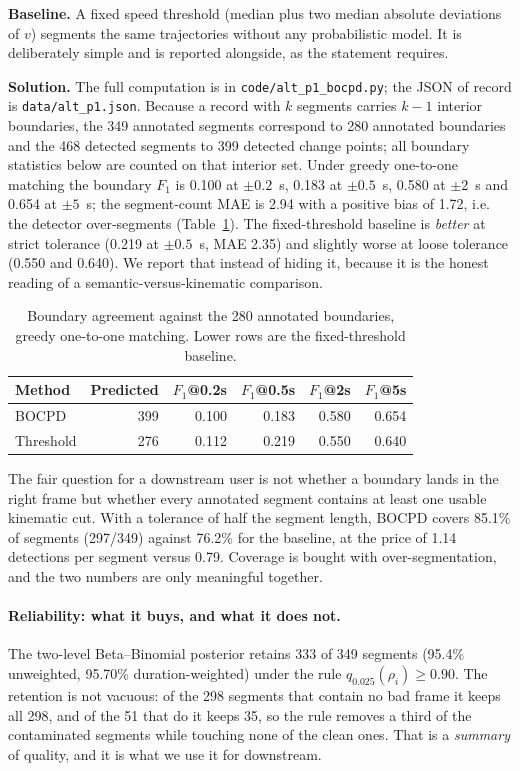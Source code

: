 \documentclass{swmcmthesis}
\begin{document}
\textbf{Baseline.} A fixed speed threshold (median plus two median absolute deviations of $v$) segments the same trajectories without any probabilistic model. It is deliberately simple and is reported alongside, as the statement requires.

\textbf{Solution.} The full computation is in \texttt{code/alt\_p1\_bocpd.py}; the JSON of record is \texttt{data/alt\_p1.json}. Because a record with $k$ segments carries $k-1$ interior boundaries, the 349 annotated segments correspond to 280 annotated boundaries and the 468 detected segments to 399 detected change points; all boundary statistics below are counted on that interior set. Under greedy one-to-one matching the boundary $F_1$ is 0.100 at $\pm0.2$~s, 0.183 at $\pm0.5$~s, 0.580 at $\pm2$~s and 0.654 at $\pm5$~s; the segment-count MAE is 2.94 with a positive bias of 1.72, i.e. the detector over-segments (Table~\ref{tab:p1f1}). The fixed-threshold baseline is \emph{better} at strict tolerance (0.219 at $\pm0.5$~s, MAE 2.35) and slightly worse at loose tolerance (0.550 and 0.640). We report that instead of hiding it, because it is the honest reading of a semantic-versus-kinematic comparison.

\begin{table}[tbp]\centering\footnotesize
\caption{Boundary agreement against the 280 annotated boundaries, greedy one-to-one matching. Lower rows are the fixed-threshold baseline.}\label{tab:p1f1}
\begin{tabular}{lrrrrr}
\toprule
Method & Predicted & $F_1$@0.2s & $F_1$@0.5s & $F_1$@2s & $F_1$@5s \\
\midrule
BOCPD & 399 & 0.100 & 0.183 & 0.580 & 0.654 \\
Threshold & 276 & 0.112 & 0.219 & 0.550 & 0.640 \\
\bottomrule
\end{tabular}
\end{table}

The fair question for a downstream user is not whether a boundary lands in the right frame but whether every annotated segment contains at least one usable kinematic cut. With a tolerance of half the segment length, BOCPD covers 85.1\% of segments (297/349) against 76.2\% for the baseline, at the price of 1.14 detections per segment versus 0.79. Coverage is bought with over-segmentation, and the two numbers are only meaningful together.

\paragraph{Reliability: what it buys, and what it does not.} The two-level Beta--Binomial posterior retains 333 of 349 segments (95.4\% unweighted, 95.70\% duration-weighted) under the rule $q_{0.025}(\rho_i)\ge0.90$. The retention is not vacuous: of the 298 segments that contain no bad frame it keeps all 298, and of the 51 that do it keeps 35, so the rule removes a third of the contaminated segments while touching none of the clean ones. That is a \emph{summary} of quality, and it is what we use it for downstream.
\end{document}
